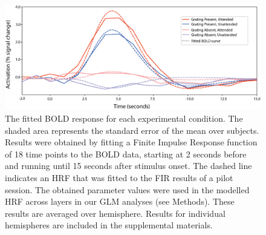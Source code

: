 \documentclass[9pt,lineno]{aperture}
\begin{document}
\begin{figure}
\includegraphics[width=\linewidth]{img/fir.eps}
\caption{ The fitted BOLD response for each experimental condition. The shaded area represents the standard error of the mean over subjects. Results were obtained by fitting a Finite Impulse Response function of 18 time points to the BOLD data, starting at 2 seconds before and running until 15 seconds after stimulus onset. The dashed line indicates an HRF that was fitted to the FIR results of a pilot session. The obtained parameter values were used in the modelled HRF across layers in our GLM analyses (see Methods). These results are averaged over hemisphere. Results for individual hemispheres are included in the supplemental materials.}
\label{fig:fir_global}
\label{figsupp:fir_both_hemis}
\end{figure}
\end{document}

